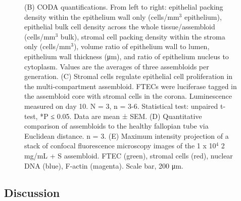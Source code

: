 \begin{refsection}
    \begin{figure}[h!]
        \ContinuedFloat
        \captionsetup{font=small}
        \caption[]{(B) CODA quantifications. From left to right: epithelial packing density within the epithelium wall only (cells/mm$^3$ epithelium), epithelial bulk cell density across the whole tissue/assembloid (cells/mm$^3$ bulk), stromal cell packing density within the stroma only (cells/mm$^3$), volume ratio of epithelium wall to lumen, epithelium wall thickness (μm), and ratio of epithelium nucleus to cytoplasm. Values are the averages of three assembloids per generation. (C) Stromal cells regulate epithelial cell proliferation in the multi-compartment assembloid. FTECs were luciferase tagged in the assembloid core with stromal cells in the corona. Luminescence measured on day 10. N = 3, n = 3-6. Statistical test: unpaired t-test, *P ≤ 0.05. Data are mean ± SEM. (D) Quantitative comparison of assembloids to the healthy fallopian tube via Euclidean distance. n = 3. (E) Maximum intensity projection of a stack of confocal fluorescence microscopy images of the 1 x 10$^4$ 2 mg/mL + S assembloid. FTEC (green), stromal cells (red), nuclear DNA (blue), F-actin (magenta). Scale bar, 200 μm.}
    \end{figure}

    
    \FloatBarrier
    \subsection{Discussion}
    

\end{refsection}
